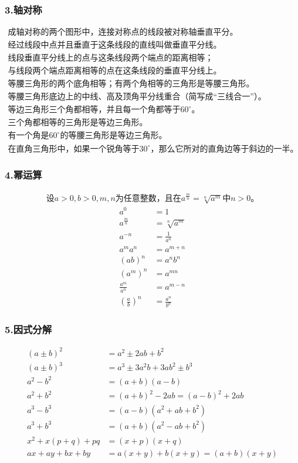 \documentclass{ctexart}
\begin{document}
\subsubsection*{3.轴对称}
\begin{gather*}
\text{成轴对称的两个图形中，连接对称点的线段被对称轴垂直平分。} \\
\text{经过线段中点并且垂直于这条线段的直线叫做垂直平分线。} \\
\text{线段垂直平分线上的点与这条线段两个端点的距离相等；} \\
\text{与线段两个端点距离相等的点在这条线段的垂直平分线上。} \\
\text{等腰三角形的两个底角相等；有两个角相等的三角形是等腰三角形。} \\
\text{等腰三角形底边上的中线、高及顶角平分线重合（简写成“三线合一”）。} \\
\text{等边三角形三个角都相等，并且每一个角都等于$60^\circ$。} \\
\text{三个角都相等的三角形是等边三角形。} \\
\text{有一个角是$60^\circ$的等腰三角形是等边三角形。} \\
\text{在直角三角形中，如果一个锐角等于$30^\circ$，那么它所对的直角边等于斜边的一半。}
\end{gather*}
\subsubsection*{4.幂运算}
\begin{gather*}
\text{设$a>0,b>0,m,n$为任意整数，且在$a^{\frac{m}{n}}=\sqrt[n]{a^m}$中$n>0$。}
\end{gather*}
\begin{align*}
a^0&=1 \\
a^{\frac{m}{n}}&=\sqrt[n]{a^m} \\
a^{-n}&=\frac{1}{a^n} \\
a^ma^n&=a^{m+n} \\
(ab)^n&=a^nb^n \\
(a^m)^n&=a^{mn} \\
\frac{a^m}{a^n}&=a^{m-n} \\
(\frac{a}{b})^n&=\frac{a^n}{b^n}
\end{align*}
\subsubsection*{5.因式分解}
\begin{align*}
(a\pm b)^2&=a^2\pm 2ab+b^2 \\
(a\pm b)^3&=a^3\pm 3a^2b+3ab^2\pm b^3 \\
a^2-b^2&=(a+b)(a-b) \\
a^2+b^2&=(a+b)^2-2ab=(a-b)^2+2ab \\
a^3-b^3&=(a-b)(a^2+ab+b^2) \\
a^3+b^3&=(a+b)(a^2-ab+b^2) \\
x^2+x(p+q)+pq&=(x+p)(x+q) \\
ax+ay+bx+by&=a(x+y)+b(x+y)=(a+b)(x+y)
\end{align*}
\end{document}

